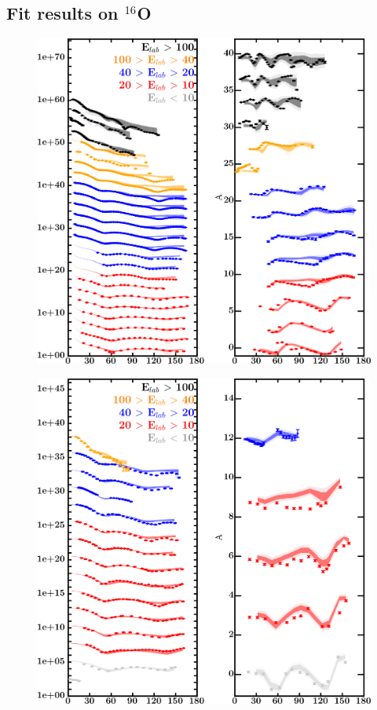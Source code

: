 \documentclass[twocolumn,secnumarabic,amssymb, nobibnotes, aps, prl,
superscriptaddress, nobalancelastpage]{revtex4}
\begin{document}
\subsection{Fit results on $^{16}$O}
\begin{figure}[!htb]
    \centering
    \begin{minipage}{0.45\textwidth}
        \centering
        \includegraphics[width=\textwidth]{figures/o16_protonElastic.png}
        \label{DOM_o16_proton_elastic}
    \end{minipage}\hspace{6pt}
    \begin{minipage}{0.45\textwidth}
        \centering
        \includegraphics[width=\textwidth]{figures/o16_neutronElastic.png}

\end{minipage}
\end{figure}
\end{document}
